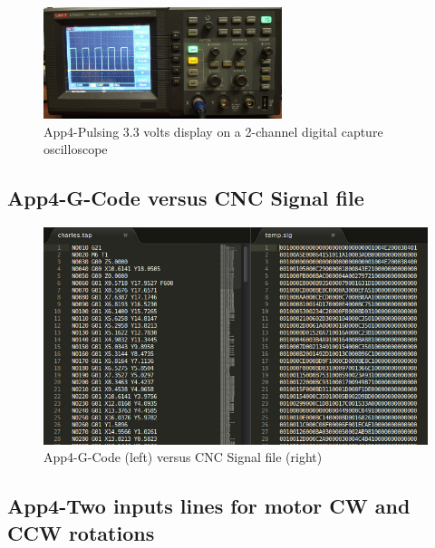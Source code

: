 \begin{figure}[htbp]
	\begin{center}
		\includegraphics[width=0.62\textwidth]{./07-images/img-Ch4App/pulsing-3-3v-display-on-2-channel-oscilloscope.jpg}
		\caption{App4-Pulsing 3.3 volts display on a 2-channel digital capture oscilloscope}
		\label{fig:App4-pulsing-3.3v-display-on-2-channel-oscilloscope.jpg}
	\end{center}
\end{figure}


\pagebreak
\subsection{App4-G-Code versus CNC Signal file}

\begin{figure}[htbp]
	\begin{center}
		\includegraphics[width=1.00\textwidth]{./07-images/img-Ch4App/gcode-left-to-signal-file-right.jpg}
		\caption{App4-G-Code (left) versus CNC Signal file (right)}
		\label{fig:App4-gcode-left-to-signal-file-right.jpg}
	\end{center}
\end{figure}

\subsection{App4-Two inputs lines for motor CW and CCW rotations}

